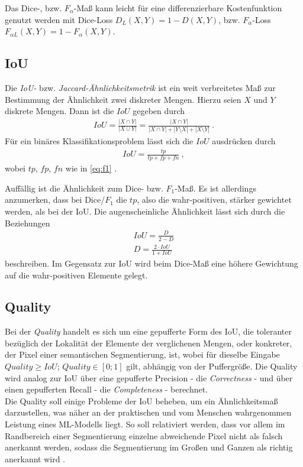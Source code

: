 Das Dice-, bzw. $F_{\alpha}$-Maß kann leicht für eine differenzierbare Kostenfunktion genutzt werden mit Dice-Loss $D_{L}(X, Y) = 1 - D(X,Y)$, bzw. $F_{\alpha}$-Loss $F_{\alpha L}(X,Y) = 1 - F_{\alpha}(X,Y)$. 


\subsection{\acf{IoU}}

Die \textit{\acf{IoU}-} bzw. \textit{Jaccard-Ähnlichkeitsmetrik} ist ein weit verbreitetes Maß zur Bestimmung der Ähnlichkeit zwei diskreter Mengen. Hierzu seien $X$ und $Y$ diskrete Mengen. Dann ist die $IoU$ gegeben durch 
\begin{align}
	\label{eq:iou} IoU = \frac{|X\cap Y|}{|X \cup Y|} = \frac{| X \cap Y |}{| X \cap Y | + |Y \setminus X| + |X \setminus Y|}~.
\end{align} 
Für ein binäres Klassifikationsproblem lässt sich die $IoU$ ausdrücken durch 
\begin{align}
	\label{eq:iou-binary} IoU = \frac{tp}{tp + fp + fn}~,
\end{align}
wobei $tp$, $fp$, $fn$ wie in \autoref{eq:f1} \cite{Fletcher.2018}. 

Auffällig ist die Ähnlichkeit zum Dice- bzw. $F_{1}$-Maß. Es ist allerdings anzumerken, dass bei Dice/$F_1$ die $tp$, also die wahr-positiven, stärker gewichtet werden, als bei der \ac{IoU}. Die augenscheinliche Ähnlichkeit lässt sich durch die Beziehungen
\begin{align}
	\label{eq:dice-iou} IoU = \frac{D}{2 - D} \\
	D = \frac{2 \cdot IoU}{1 + IoU}
\end{align}
beschreiben.
Im Gegensatz zur \ac{IoU} wird beim Dice-Maß eine höhere Gewichtung auf die wahr-positiven Elemente 
gelegt.

\subsection{Quality}

Bei der \textit{Quality} handelt es sich um eine gepufferte Form des \ac{IoU},
die toleranter bezüglich der Lokalität der Elemente der verglichenen Mengen, oder konkreter,
der Pixel einer semantischen Segmentierung, ist, 
wobei für dieselbe Eingabe $Quality \geq IoU$; $Quality \in [0;1]$ gilt, abhängig von der Puffergröße. 
Die Quality wird analog zur \ac{IoU} über eine gepufferte Precision - die \textit{Correctness} - 
und über einen gepufferten Recall - die \textit{Completeness} - berechnet. \\
Die Quality soll einige Probleme der \ac{IoU} beheben, um ein Ähnlichkeitsmaß darzustellen, 
was näher an der praktischen und vom Menschen wahrgenommen Leistung eines \ac{ML}-Modells liegt.
So soll relativiert werden, dass vor allem im Randbereich einer Segmentierung einzelne abweichende Pixel
nicht als falsch anerkannt werden, sodass die Segmentierung im Großen und Ganzen als richtig anerkannt wird \cite{ChristianWiedemann.1998}. 


